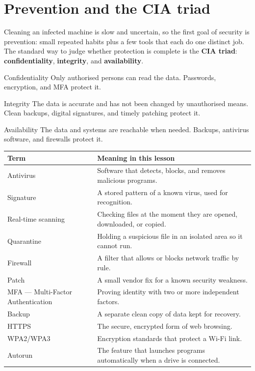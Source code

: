 \section{Prevention and the CIA triad}
Cleaning an infected machine is slow and uncertain, so the first goal of
security is prevention: small repeated habits plus a few tools that each do
one distinct job. The standard way to judge whether protection is complete is
the \textbf{CIA triad}: \textbf{confidentiality}, \textbf{integrity}, and
\textbf{availability}.

\begin{definitionbox}{Confidentiality}
Only authorised persons can read the data. Passwords, encryption, and MFA
protect it.
\end{definitionbox}

\begin{definitionbox}{Integrity}
The data is accurate and has not been changed by unauthorised means.
Clean backups, digital signatures, and timely patching protect it.
\end{definitionbox}

\begin{definitionbox}{Availability}
The data and systems are reachable when needed. Backups, antivirus software,
and firewalls protect it.
\end{definitionbox}

\begin{center}
\begin{tabular}{p{}p{}}
\toprule
\textbf{Term} & \textbf{Meaning in this lesson} \\
\midrule
Antivirus & Software that detects, blocks, and removes malicious programs. \\
Signature & A stored pattern of a known virus, used for recognition. \\
Real-time scanning & Checking files at the moment they are opened, downloaded, or copied. \\
Quarantine & Holding a suspicious file in an isolated area so it cannot run. \\
Firewall & A filter that allows or blocks network traffic by rule. \\
Patch & A small vendor fix for a known security weakness. \\
MFA --- Multi-Factor Authentication & Proving identity with two or more independent factors. \\
Backup & A separate clean copy of data kept for recovery. \\
HTTPS & The secure, encrypted form of web browsing. \\
WPA2/WPA3 & Encryption standards that protect a Wi-Fi link. \\
Autorun & The feature that launches programs automatically when a drive is connected. \\
\bottomrule
\end{tabular}
\end{center}

